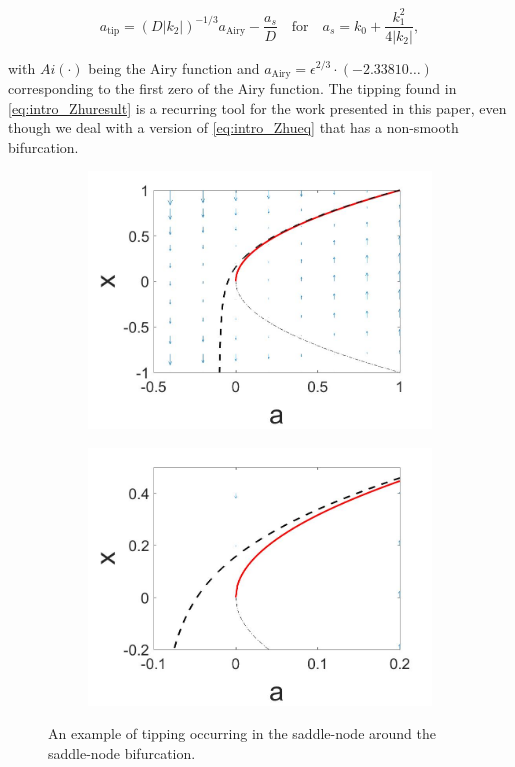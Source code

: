 \begin{equation}\label{eq:intro_Zhuresult}
a_{\text{tip}}=(D|k_2|)^{-1/3}a_{\text{Airy}}-\frac{a_s}{D}\quad \text{for} \quad a_s = k_0+\frac{k_1^2}{4|k_2|},
\end{equation}

with $Ai(\cdot)$ being the Airy function and $a_{\text{Airy}}=\epsilon^{2/3}\cdot(-2.33810\ldots)$ corresponding to the first zero of the Airy function. The tipping found in \eqref{eq:intro_Zhuresult} is a recurring tool for the work presented in this paper, even though we deal with a version of \eqref{eq:intro_Zhueq} that has a non-smooth bifurcation.

\begin{figure}[H]
\centering
\begin{subfigure}{.5\textwidth}
  \centering
  \includegraphics[width=\linewidth]{intro/saddlenode_tipping.jpg}
  \caption{}
\end{subfigure}%
\begin{subfigure}{.5\textwidth}
  \centering
  \includegraphics[width=\linewidth]{intro/saddlenode_tipping_zoom.jpg}
  \caption{}
\end{subfigure}
\caption{An example of tipping occurring in the saddle-node around the saddle-node bifurcation.}
\label{fig:intro_tipping}
\end{figure}



